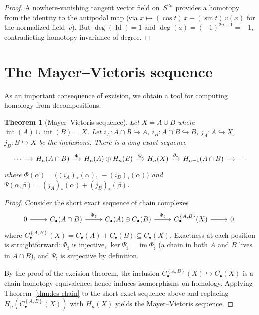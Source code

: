 \documentclass[12pt,a4paper,openany]{book}
\theoremstyle{definition}
\theoremstyle{plain}
\newtheorem{theorem}[definition]{Theorem}
\theoremstyle{remark}
\DeclareMathOperator{\im}{im}
\DeclareMathOperator{\Id}{Id}
\newcommand{\set}[1]{\left\{#1\right\}}
\begin{document}
\begin{proof}
A nowhere-vanishing tangent vector field on~$S^{2n}$ provides a homotopy
from the identity to the antipodal map (via $x\mapsto(\cos t)\,x+(\sin t)\,v(x)$
for the normalized field~$v$).
But $\deg(\Id)=1$ and $\deg(a)=(-1)^{2n+1}=-1$, contradicting homotopy
invariance of degree.
\end{proof}

\section{The Mayer--Vietoris sequence}\label{sec:mayer-vietoris}

As an important consequence of excision, we obtain a tool for computing
homology from decompositions.

\begin{theorem}[Mayer--Vietoris sequence]\label{thm:mayer-vietoris}
Let $X=A\cup B$ where $\operatorname{int}(A)\cup\operatorname{int}(B)=X$.
Let $i_A\colon A\cap B\hookrightarrow A$, $i_B\colon A\cap B\hookrightarrow B$,
$j_A\colon A\hookrightarrow X$, $j_B\colon B\hookrightarrow X$ be the
inclusions.  There is a long exact sequence
\[
\begin{tikzcd}[column sep=1.2em]
  \cdots \ar[r]
  & H_n(A\cap B) \ar[r,"\Phi"]
  & H_n(A)\oplus H_n(B) \ar[r,"\Psi"]
  & H_n(X) \ar[r,"\partial_*"]
  & H_{n-1}(A\cap B) \ar[r]
  & \cdots
\end{tikzcd}
\]
where $\Phi(\alpha)=\bigl((i_A)_*(\alpha),\,-(i_B)_*(\alpha)\bigr)$
and $\Psi(\alpha,\beta)=(j_A)_*(\alpha)+(j_B)_*(\beta)$.
\end{theorem}

\begin{proof}
Consider the short exact sequence of chain complexes
\[
\begin{tikzcd}
  0 \ar[r]
  & C_\bullet(A\cap B) \ar[r,"\Phi_\sharp"]
  & C_\bullet(A)\oplus C_\bullet(B) \ar[r,"\Psi_\sharp"]
  & C_\bullet^{\set{A,B}}(X) \ar[r]
  & 0,
\end{tikzcd}
\]
where $C_\bullet^{\set{A,B}}(X)=C_\bullet(A)+C_\bullet(B)\subseteq C_\bullet(X)$.
Exactness at each position is straightforward:
$\Phi_\sharp$ is injective,
$\ker\Psi_\sharp=\im\Phi_\sharp$ (a chain in both $A$ and $B$ lives in $A\cap B$),
and $\Psi_\sharp$ is surjective by definition.

By the proof of the excision theorem, the inclusion
$C_\bullet^{\set{A,B}}(X)\hookrightarrow C_\bullet(X)$ is a chain
homotopy equivalence, hence induces isomorphisms on homology.
Applying Theorem~\ref{thm:les-chain} to the short exact sequence above
and replacing $H_n(C_\bullet^{\set{A,B}}(X))$ with $H_n(X)$ yields the
Mayer--Vietoris sequence.
\end{proof}
\end{document}
